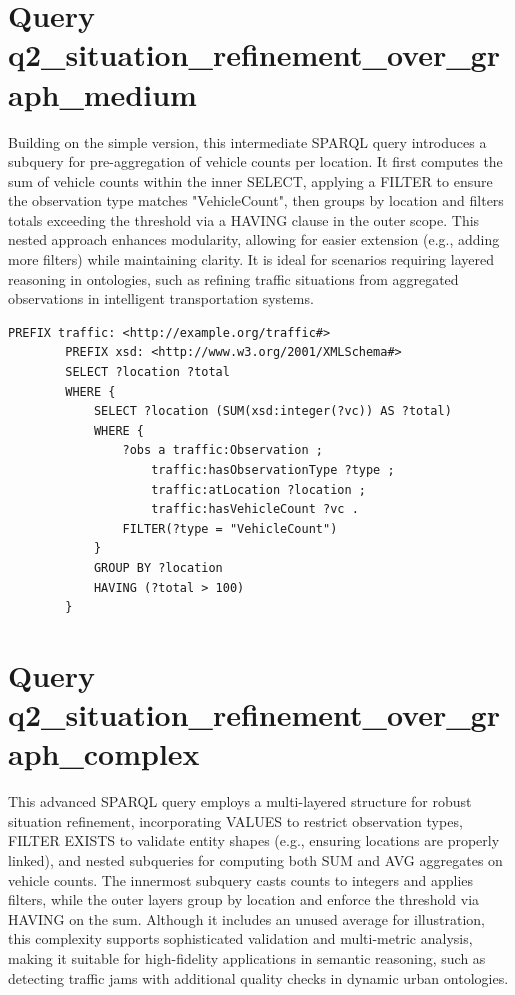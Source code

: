 \documentclass[5p,times]{elsarticle}
\begin{document}
\section{Query q2_situation_refinement_over_graph_medium}

Building on the simple version, this intermediate SPARQL query introduces a subquery for pre-aggregation of vehicle counts per location. It first computes the sum of vehicle counts within the inner SELECT, applying a FILTER to ensure the observation type matches "VehicleCount", then groups by location and filters totals exceeding the threshold via a HAVING clause in the outer scope. This nested approach enhances modularity, allowing for easier extension (e.g., adding more filters) while maintaining clarity. It is ideal for scenarios requiring layered reasoning in ontologies, such as refining traffic situations from aggregated observations in intelligent transportation systems.
\begin{lstlisting}[caption={Query for q2\_situation\_refinement\_over\_graph\_medium}, float=H, label={lst:q2-medium}]
        PREFIX traffic: <http://example.org/traffic#>
        PREFIX xsd: <http://www.w3.org/2001/XMLSchema#>
        SELECT ?location ?total
        WHERE {
            SELECT ?location (SUM(xsd:integer(?vc)) AS ?total)
            WHERE {
                ?obs a traffic:Observation ;
                    traffic:hasObservationType ?type ;
                    traffic:atLocation ?location ;
                    traffic:hasVehicleCount ?vc .
                FILTER(?type = "VehicleCount")
            }
            GROUP BY ?location
            HAVING (?total > 100)
        }
        \end{lstlisting}


\section{Query q2_situation_refinement_over_graph_complex}

This advanced SPARQL query employs a multi-layered structure for robust situation refinement, incorporating VALUES to restrict observation types, FILTER EXISTS to validate entity shapes (e.g., ensuring locations are properly linked), and nested subqueries for computing both SUM and AVG aggregates on vehicle counts. The innermost subquery casts counts to integers and applies filters, while the outer layers group by location and enforce the threshold via HAVING on the sum. Although it includes an unused average for illustration, this complexity supports sophisticated validation and multi-metric analysis, making it suitable for high-fidelity applications in semantic reasoning, such as detecting traffic jams with additional quality checks in dynamic urban ontologies.
\end{document}
